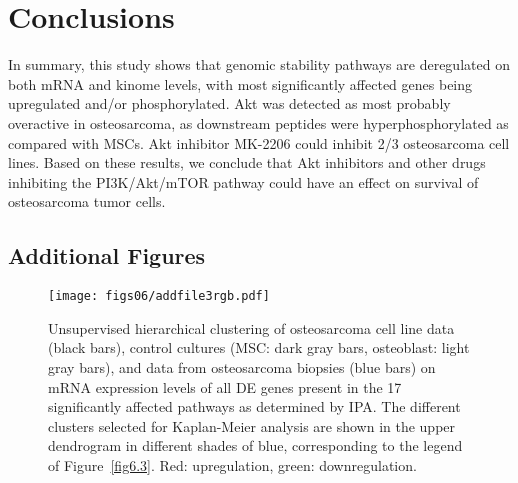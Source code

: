 \section{Conclusions}\label{conclusions6}
In summary, this study shows that genomic stability pathways are deregulated on both mRNA and kinome levels, with most significantly affected genes being upregulated and/or phosphorylated. Akt was detected as most probably overactive in osteosarcoma, as downstream peptides were hyperphosphorylated as compared with MSCs. Akt inhibitor MK-2206 could inhibit 2/3 osteosarcoma cell lines. Based on these results, we conclude that Akt inhibitors and other drugs inhibiting the PI3K/Akt/mTOR pathway could have an effect on survival of osteosarcoma tumor cells.


\begin{small}
\begin{singlespace}

\end{singlespace}
\end{small}

\begin{subappendices}
	\newpage
	\setcounter{figure}{0}
	\section{Additional Figures}
		\renewcommand{\figurename}{Additional Figure}
		\begin{figure}[h]
		  \centering
		    \texttt{[image: figs06/addfile3rgb.pdf]}	%
		    \caption{Unsupervised hierarchical clustering of osteosarcoma cell line data (black bars), control cultures (MSC: dark gray bars, osteoblast: light gray bars), and data from osteosarcoma biopsies (blue bars) on mRNA expression levels of all DE genes present in the 17 significantly affected pathways as determined by IPA. The different clusters selected for Kaplan\hyp{}Meier analysis are shown in the upper dendrogram in different shades of blue, corresponding to the legend of Figure~\ref{fig6.3}. Red: upregulation, green: downregulation.} %
		     \label{afig6.1}
		\end{figure}
\end{subappendices}

%